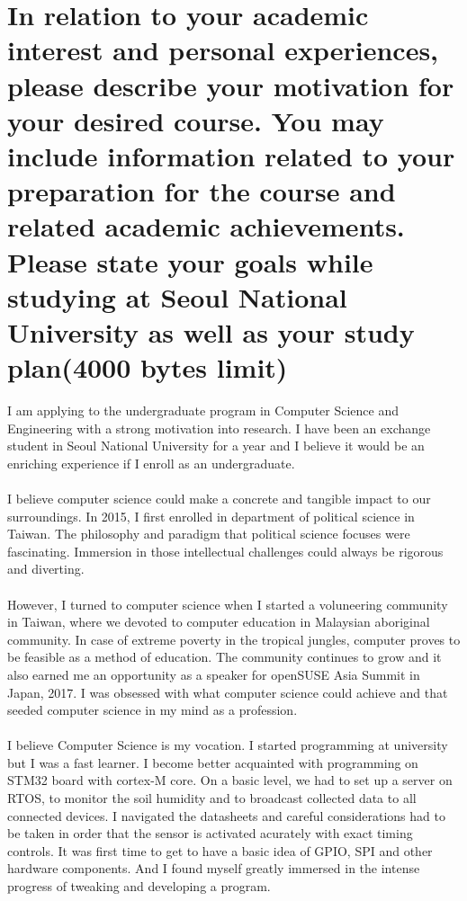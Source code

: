 \documentclass{article}
\begin{document}
\pagestyle{fancy}


\section{In relation to your academic interest and personal experiences, please describe your motivation for your desired course. You may include information related to your preparation for the course and related academic achievements. Please state your goals while studying at Seoul National University as well as your study plan(4000 bytes limit)}


I am applying to the undergraduate program in Computer Science and Engineering with a strong motivation into research. I have been an exchange student in Seoul National University for a year and I believe it would be an enriching experience if I enroll as an undergraduate. \\
\\ 
 I believe computer science could make a concrete and tangible impact to our surroundings. In 2015, I first enrolled in department of political science in Taiwan. The philosophy and paradigm that political science focuses were fascinating. Immersion in those intellectual challenges could always be rigorous and diverting.	\\
 \\
 However, I turned to computer science when I started a voluneering community in Taiwan, where we devoted to computer education in Malaysian aboriginal community. In case of extreme poverty in the tropical jungles, computer proves to be feasible as a method of education. The community continues to grow and it also earned me an opportunity as a speaker for openSUSE Asia Summit in Japan, 2017. I was obsessed with what computer science could achieve and that seeded computer science in my mind as a profession. \\
\\ 
 I believe Computer Science is my vocation. I started programming at university but I was a fast learner. I become better acquainted with programming on STM32 board with cortex-M core. On a basic level, we had to set up a server on RTOS, to monitor the soil humidity and to broadcast collected data to all connected devices. I navigated the datasheets and careful considerations had to be taken in order that the sensor is activated acurately with exact timing controls. It was first time to get to have a basic idea of GPIO, SPI and other hardware components. And I found myself greatly immersed in the intense progress of tweaking and developing a program. \\
\end{document}
